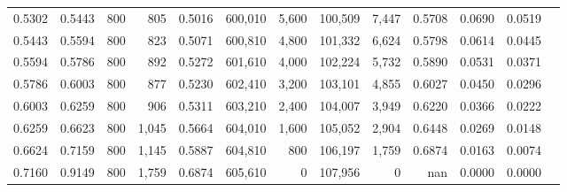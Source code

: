 \begin{tabular}{rrrrrrrrrrrrr}
0.5302 & 0.5443 &    800 &   805 &                                     0.5016 & 600,010 &   5,600 & 100,509 &   7,447 & 0.5708 & 0.0690 & 0.0519 \\
0.5443 & 0.5594 &    800 &   823 &                                     0.5071 & 600,810 &   4,800 & 101,332 &   6,624 & 0.5798 & 0.0614 & 0.0445 \\
0.5594 & 0.5786 &    800 &   892 &                                     0.5272 & 601,610 &   4,000 & 102,224 &   5,732 & 0.5890 & 0.0531 & 0.0371 \\
0.5786 & 0.6003 &    800 &   877 &                                     0.5230 & 602,410 &   3,200 & 103,101 &   4,855 & 0.6027 & 0.0450 & 0.0296 \\
0.6003 & 0.6259 &    800 &   906 &                                     0.5311 & 603,210 &   2,400 & 104,007 &   3,949 & 0.6220 & 0.0366 & 0.0222 \\
0.6259 & 0.6623 &    800 & 1,045 &                                     0.5664 & 604,010 &   1,600 & 105,052 &   2,904 & 0.6448 & 0.0269 & 0.0148 \\
0.6624 & 0.7159 &    800 & 1,145 &                                     0.5887 & 604,810 &     800 & 106,197 &   1,759 & 0.6874 & 0.0163 & 0.0074 \\
0.7160 & 0.9149 &    800 & 1,759 &                                     0.6874 & 605,610 &       0 & 107,956 &       0 &    nan & 0.0000 & 0.0000 \\
\bottomrule
\end{tabular}
